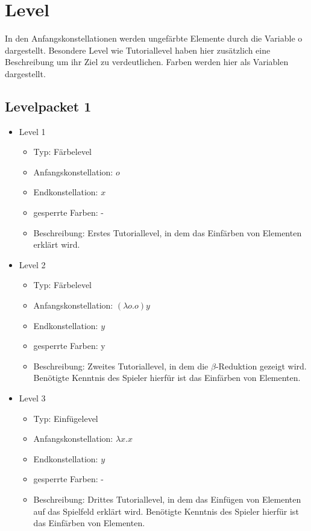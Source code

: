 \chapter{Level}
In den Anfangskonstellationen werden ungefärbte Elemente durch die Variable o dargestellt. 
Besondere Level wie Tutoriallevel haben hier zusätzlich eine Beschreibung um ihr Ziel zu verdeutlichen.
Farben werden hier als Variablen dargestellt.

\section{Levelpacket 1}
\begin{itemize}
	\item{Level 1} 
		\begin{itemize}
			\item{Typ:} Färbelevel 
			\item{Anfangskonstellation:} \( o\)
			\item{Endkonstellation:} \( x\)
			\item{gesperrte Farben:} -  
			\item{Beschreibung:} Erstes Tutoriallevel, in dem das Einfärben von Elementen erklärt wird.
		\end{itemize}

	\item{Level 2} 
		\begin{itemize}
			\item{Typ:} Färbelevel 
			\item{Anfangskonstellation:} \((\lambda o . o ) y\)   
			\item{Endkonstellation:} \(y\) 
			\item{gesperrte Farben:} y 
			\item{Beschreibung:} Zweites Tutoriallevel, in dem die \(\beta\)-Reduktion gezeigt wird.
								Benötigte Kenntnis des Spieler hierfür ist das Einfärben von Elementen. 
		\end{itemize}

	\item{Level 3} 
		\begin{itemize}
			\item{Typ:} Einfügelevel 
			\item{Anfangskonstellation:} \(\lambda x . x \)   
			\item{Endkonstellation:} \(y\)
			\item{gesperrte Farben:} -  
			\item{Beschreibung:} Drittes Tutoriallevel, in dem das Einfügen von Elementen auf das Spielfeld erklärt wird.
								Benötigte Kenntnis des Spieler hierfür ist das Einfärben von Elementen. 
		\end{itemize}


\end{itemize}
